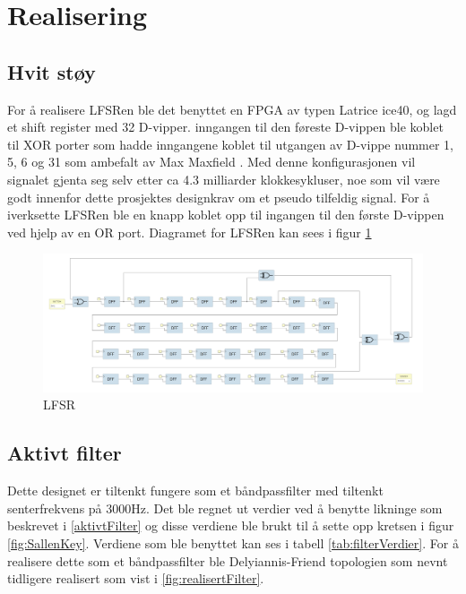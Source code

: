 \newpage
\section{Realisering}
\label{realiseringOgTest}

\subsection{Hvit støy}
\label{hvitStoeoy}
For å realisere LFSRen ble det benyttet en FPGA av typen Latrice ice40, og lagd et shift register med 32 D-vipper. inngangen til den føreste D-vippen ble koblet til XOR porter som hadde inngangene koblet til utgangen av D-vippe nummer 1, 5, 6 og 31 som ambefalt av Max Maxfield \cite{LFSR}. Med denne konfigurasjonen vil signalet gjenta seg selv etter ca 4.3 milliarder klokkesykluser, noe som vil være godt innenfor dette prosjektes designkrav om et pseudo tilfeldig signal. For å iverksette LFSRen ble en knapp koblet opp til ingangen til den første D-vippen ved hjelp av en OR port. Diagramet for LFSRen kan sees i figur \ref{fig:LFSRdiagram}

\begin{figure} [!h]
\centering
\includegraphics[width=1\linewidth]{Bilder/LFSR.png}
\caption{LFSR}
\label{fig:LFSRdiagram}
\end{figure}

\subsection{Aktivt filter}
\label{aktivtFilterRealisering}
Dette designet er tiltenkt fungere som et båndpassfilter med tiltenkt senterfrekvens på 3000Hz. Det ble regnet ut verdier ved å benytte likninge som beskrevet i \autoref{aktivtFilter} og disse verdiene ble brukt til å sette opp kretsen i figur \ref{fig:SallenKey}. Verdiene som ble benyttet kan ses i tabell \ref{tab:filterVerdier}. For å realisere dette som et båndpassfilter ble Delyiannis-Friend topologien som nevnt tidligere realisert som vist i \autoref{fig:realisertFilter}.

